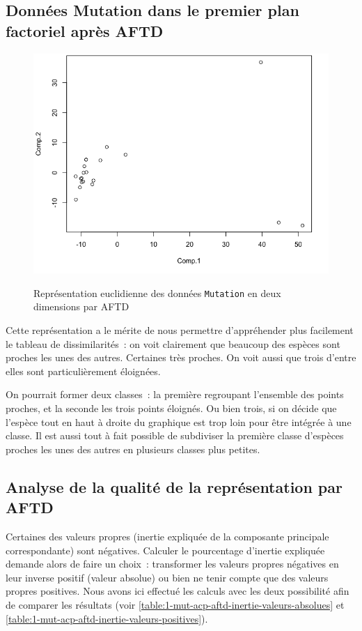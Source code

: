 \documentclass[a4paper,10pt]{report}
\begin{document}
\subsection{Données Mutation dans le premier plan factoriel après AFTD}

\begin{figure}[H]
	\centering
	\captionsetup{justification=centering, margin=4cm}
	\caption{\small Représentation euclidienne des données \texttt{Mutation} en deux dimensions par AFTD}
	\includegraphics[width=.5\linewidth]{img/1-mut-acp-aftd-premier-plan-factoriel}
	\label{fig:1-mut-acp-aftd-deux-dimensions}%
\end{figure}


Cette représentation a le mérite de nous permettre d'appréhender plus facilement le tableau de dissimilarités~: on voit clairement que beaucoup des espèces sont proches les unes des autres. Certaines très proches. On voit aussi que trois d'entre elles sont particulièrement éloignées.

On pourrait former deux classes~: la première regroupant l'ensemble des points proches, et la seconde les trois points éloignés. Ou bien trois, si on décide que l'espèce tout en haut à droite du graphique est trop loin pour être intégrée à une classe. Il est aussi tout à fait possible de subdiviser la première classe d'espèces proches les unes des autres en plusieurs classes plus petites.




\subsection{Analyse de la qualité de la représentation par AFTD}

Certaines des valeurs propres (inertie expliquée de la composante principale correspondante) sont négatives. Calculer le pourcentage d'inertie expliquée demande alors de faire un choix~: transformer les valeurs propres négatives en leur inverse positif (valeur absolue) ou bien ne tenir compte que des valeurs propres positives. Nous avons ici effectué les calculs avec les deux possibilité afin de comparer les résultats (voir \autoref{table:1-mut-acp-aftd-inertie-valeurs-absolues} et \autoref{table:1-mut-acp-aftd-inertie-valeurs-positives}).
\end{document}

